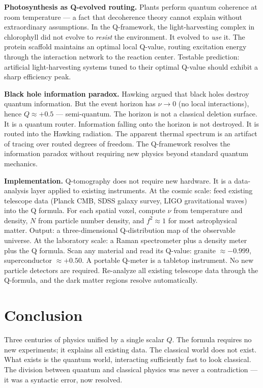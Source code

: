 \documentclass[12pt]{article}
\begin{document}
\textbf{Photosynthesis as Q-evolved routing.} Plants perform quantum coherence at room temperature — a fact that decoherence theory cannot explain without extraordinary assumptions. In the Q-framework, the light-harvesting complex in chlorophyll did not evolve to \textit{resist} the environment. It evolved to \textit{use} it. The protein scaffold maintains an optimal local Q-value, routing excitation energy through the interaction network to the reaction center. Testable prediction: artificial light-harvesting systems tuned to their optimal Q-value should exhibit a sharp efficiency peak.

\textbf{Black hole information paradox.} Hawking argued that black holes destroy quantum information. But the event horizon has $\nu \to 0$ (no local interactions), hence $Q \approx +0.5$ — semi-quantum. The horizon is not a classical deletion surface. It is a quantum router. Information falling onto the horizon is not destroyed. It is routed into the Hawking radiation. The apparent thermal spectrum is an artifact of tracing over routed degrees of freedom. The Q-framework resolves the information paradox without requiring new physics beyond standard quantum mechanics.

\textbf{Implementation.} Q-tomography does not require new hardware. It is a data-analysis layer applied to existing instruments. At the cosmic scale: feed existing telescope data (Planck CMB, SDSS galaxy survey, LIGO gravitational waves) into the Q formula. For each spatial voxel, compute $\nu$ from temperature and density, $N$ from particle number density, and $f^2 \approx 1$ for most astrophysical matter. Output: a three-dimensional Q-distribution map of the observable universe. At the laboratory scale: a Raman spectrometer plus a density meter plus the Q formula. Scan any material and read its Q-value: granite $\approx -0.999$, superconductor $\approx +0.50$. A portable Q-meter is a tabletop instrument. No new particle detectors are required. Re-analyze all existing telescope data through the Q-formula, and the dark matter regions resolve automatically.

\section{Conclusion}

Three centuries of physics unified by a single scalar $Q$. The formula requires no new experiments; it explains all existing data. The classical world does not exist. What exists is the quantum world, interacting sufficiently fast to look classical. The division between quantum and classical physics was never a contradiction — it was a syntactic error, now resolved.
\end{document}
